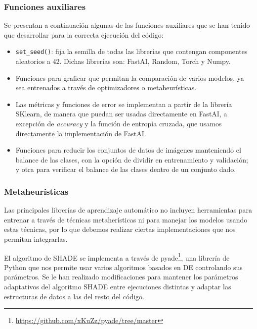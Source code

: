 \subsubsection{Funciones auxiliares}

Se presentan a continuación algunas de las funciones auxiliares que se han tenido que desarrollar para la correcta ejecución del código:

\begin{itemize}
	\item \verb|set_seed()|: fija la semilla de todas las librerías que contengan componentes aleatorios a 42. Dichas librerías son: FastAI, Random, Torch y Numpy.
	
	\item Funciones para graficar que permitan la comparación de varios modelos, ya sea entrenados a través de optimizadores o metaheurísticas.	
	
	\item Las métricas y funciones de error se implementan a partir de la librería SKlearn, de manera que puedan ser usadas directamente en FastAI, a excepción de \textit{accuracy} y la función de entropía cruzada, que usamos directamente la implementación de FastAI. 
	
	\item Funciones para reducir los conjuntos de datos de imágenes manteniendo el balance de las clases, con la opción de dividir en entrenamiento y validación; y otra para verificar el balance de las clases dentro de un conjunto dado.
	
	
\end{itemize}





\subsubsection{Metaheurísticas}

Las principales librerías de aprendizaje automático no incluyen herramientas para entrenar a través de técnicas metaherísticas ni para manejar los modelos usando estas técnicas, por lo que debemos realizar ciertas implementaciones que nos permitan integrarlas. 

El algoritmo de SHADE se implementa a través de pyade\footnote{\url{https://github.com/xKuZz/pyade/tree/master}}, una librería de Python que nos permite usar varios algoritmos basados en DE controlando sus parámetros. Se le han realizado modificaciones para mantener los parámetros adaptativos del algoritmo SHADE entre ejecuciones distintas y adaptar las estructuras de datos a las del resto del código.


